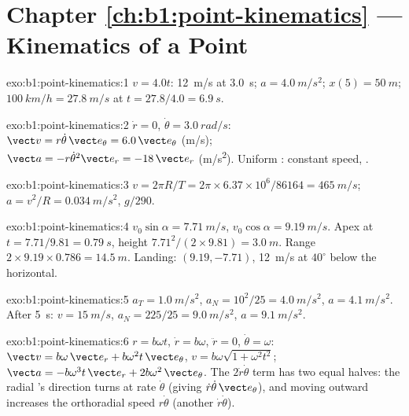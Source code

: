 \section*{Chapter \ref{ch:b1:point-kinematics} --- Kinematics of a Point}

\begin{solution}{exo:b1:point-kinematics:1}
$v = 4.0t$: \qty{12}{m/s} at \qty{3.0}{s}; $a = \qty{4.0}{m/s^2}$;
$x(5) = \qty{50}{m}$; $\qty{100}{km/h} = \qty{27.8}{m/s}$ at $t = 27.8/4.0
= \qty{6.9}{s}$.
\end{solution}

\begin{solution}{exo:b1:point-kinematics:2}
$\dot r = 0$, $\dot\theta = \qty{3.0}{rad/s}$: $\vect v = r\dot\theta\,\vect e_\theta
= 6.0\,\vect e_\theta$ (\unit{m/s}); $\vect a = -r\dot\theta^2\vect e_r =
-18\,\vect e_r$ (\unit{m/s^2}). Uniform : constant speed,
.
\end{solution}

\begin{solution}{exo:b1:point-kinematics:3}
$v = 2\pi R/T = 2\pi \times 6.37\times10^6/86164 = \qty{465}{m/s}$;
$a = v^2/R = \qty{0.034}{m/s^2}$, $g/290$.
\end{solution}

\begin{solution}{exo:b1:point-kinematics:4}
$v_0\sin\alpha = \qty{7.71}{m/s}$, $v_0\cos\alpha = \qty{9.19}{m/s}$.
Apex at $t = 7.71/9.81 = \qty{0.79}{s}$, height $7.71^2/(2 \times 9.81) =
\qty{3.0}{m}$. Range $2 \times 9.19 \times 0.786 = \qty{14.5}{m}$.
Landing: $(9.19, -7.71)$, \qty{12}{m/s} at $40^\circ$ below the
horizontal.
\end{solution}

\begin{solution}{exo:b1:point-kinematics:5}
$a_T = \qty{1.0}{m/s^2}$, $a_N = 10^2/25 = \qty{4.0}{m/s^2}$, $a =
\qty{4.1}{m/s^2}$. After \qty{5}{s}: $v = \qty{15}{m/s}$, $a_N = 225/25 =
\qty{9.0}{m/s^2}$, $a = \qty{9.1}{m/s^2}$.
\end{solution}

\begin{solution}{exo:b1:point-kinematics:6}
$r = b\omega t$, $\dot r = b\omega$, $\ddot r = 0$, $\dot\theta = \omega$:
$\vect v = b\omega\,\vect e_r + b\omega^2 t\,\vect e_\theta$, $v = b\omega
\sqrt{1 + \omega^2t^2}$; $\vect a = -b\omega^3 t\,\vect e_r + 2b\omega^2\,
\vect e_\theta$. The $2\dot r\dot\theta$ term has two equal halves: the
radial 's direction turns at rate $\dot\theta$ (giving
$\dot r\dot\theta\,\vect e_\theta$), and moving outward increases the
orthoradial speed $r\dot\theta$ (another $\dot r\dot\theta$).
\end{solution}

